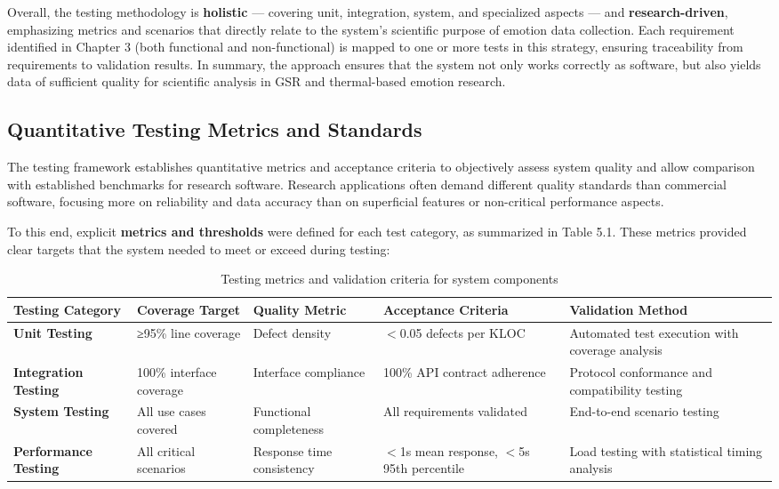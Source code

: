 \documentclass[11pt,a4paper]{report}
\begin{document}
Overall, the testing methodology is \textbf{holistic} --- covering unit,
integration, system, and specialized aspects --- and \textbf{research-driven},
emphasizing metrics and scenarios that directly relate to the system's
scientific purpose of emotion data collection. Each requirement
identified in Chapter 3 (both functional and non-functional) is mapped
to one or more tests in this strategy, ensuring traceability from
requirements to validation results. In summary, the approach ensures
that the system not only works correctly as software, but also yields
data of sufficient quality for scientific analysis in GSR and
thermal-based emotion research.

\subsection{Quantitative Testing Metrics and Standards}

The testing framework establishes quantitative metrics and acceptance
criteria to objectively assess system quality and allow comparison with
established benchmarks for research software. Research applications
often demand different quality standards than commercial software,
focusing more on reliability and data accuracy than on superficial
features or non-critical performance aspects.

To this end, explicit \textbf{metrics and thresholds} were defined for each
test category, as summarized in Table 5.1. These metrics provided clear
targets that the system needed to meet or exceed during testing:

\begin{table}[h]
\centering
\begin{tabular}{|p{3cm}|p{3cm}|p{3cm}|p{3cm}|p{3cm}|}
\hline
\textbf{Testing Category} & \textbf{Coverage Target} & \textbf{Quality Metric} & \textbf{Acceptance Criteria} & \textbf{Validation Method} \\
\hline
\textbf{Unit Testing} & ≥95\% line coverage & Defect density & $<$0.05 defects per KLOC & Automated test execution with coverage analysis \\
\hline
\textbf{Integration Testing} & 100\% interface coverage & Interface compliance & 100\% API contract adherence & Protocol conformance and compatibility testing \\
\hline
\textbf{System Testing} & All use cases covered & Functional completeness & All requirements validated & End-to-end scenario testing \\
\hline
\textbf{Performance Testing} & All critical scenarios & Response time consistency & $<$1s mean response, $<$5s 95th percentile & Load testing with statistical timing analysis \\
\hline
\end{tabular}
\caption{Testing metrics and validation criteria for system components}
\label{tab:testing-metrics}
\end{table}
\end{document}
